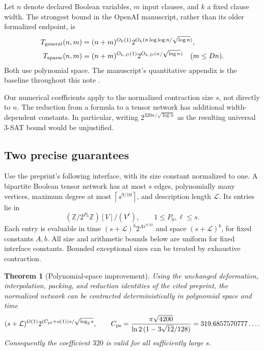 \documentclass[11pt,letterpaper]{article}
\newtheorem{theorem}{Theorem}[section]
\theoremstyle{definition}\newtheorem{definition}[theorem]{Definition}
\theoremstyle{remark}\newtheorem{remark}[theorem]{Remark}
\newcommand{\ceil}[1]{\left\lceil#1\right\rceil}
\begin{document}
Let $n$ denote declared Boolean variables, $m$ input clauses, and $k$ a fixed
clause width. The strongest bound in the OpenAI manuscript, rather than its
older formalized endpoint, is
\begin{align}
 T_{\rm general}(n,m)&=(n+m)^{O_k(1)}
  2^{O_k(n\log\log n/\sqrt{\log n})},\label{eq:general}\\
 T_{\rm sparse}(n,m)&=(n+m)^{O_{k,D}(1)}
  2^{O_{k,D}(n/\sqrt{\log n})}\quad(m\le Dn).
 \label{eq:sparse}
\end{align}
Both use polynomial space. The manuscript's quantitative appendix is the
baseline throughout this note \cite{openai,reduction,contraction}.

Our numerical coefficients apply to the normalized contraction size $s$,
not directly to $n$. The reduction from a formula to a tensor network has
additional width-dependent constants. In particular, writing
$2^{320n/\sqrt{\log n}}$ as the resulting universal 3-SAT bound would be
unjustified.

\subsection{Two precise guarantees}
\label{subsec:interface}
Use the preprint's following interface, with its size constant normalized to
one. A bipartite Boolean tensor network has at most $s$ edges, polynomially
many vertices, maximum degree at most $\ceil{s^{9/10}}$, and description
length $\mathcal L$. Its entries lie in
\[
 (\mathbb Z/2^{P_0}\mathbb Z)[V]/(V^\ell),
 \qquad 1\le P_0,\ell\le s.
\]
Each entry is evaluable in time $(s+\mathcal L)^b2^{A s^{9/10}}$ and
space $(s+\mathcal L)^b$, for fixed constants $A,b$.
All size and arithmetic bounds below are uniform for fixed interface
constants. Bounded exceptional sizes can be treated by exhaustive contraction.

\begin{theorem}[Polynomial-space improvement]\label{thm:main}
Using the unchanged deformation, interpolation, packing, and reduction
identities of the cited preprint, the normalized network can be contracted
deterministically in polynomial space and time
\[
 (s+\mathcal L)^{O(1)}
 2^{(C_{\rm ps}+o(1))s/\sqrt{\log_2s}},
 \qquad
 C_{\rm ps}=\frac{\pi\sqrt{4200}}
 {\ln2\,(1-3\sqrt{12}/128)}
 =319.6857570777\ldots .
\]
Consequently the coefficient $320$ is valid for all sufficiently large $s$.
\end{theorem}
\end{document}
